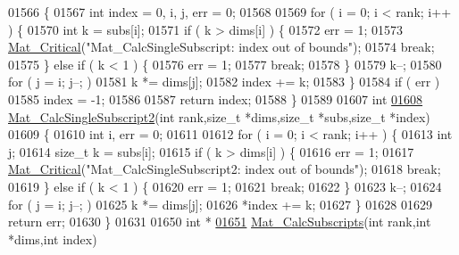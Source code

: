 \begin{DoxyCode}
{{{{{{{{{{{{{{{{{{{{{{{{{{{{{{01566 \{
01567     \textcolor{keywordtype}{int} index = 0, i, j, err = 0;
01568 
01569     \textcolor{keywordflow}{for} ( i = 0; i < rank; i++ ) \{
01570         \textcolor{keywordtype}{int} k = subs[i];
01571         \textcolor{keywordflow}{if} ( k > dims[i] ) \{
01572             err = 1;
01573             \hyperlink{group__mat__util_gaf51f2bfbb5580f575e4dd79757e2b80c}{Mat\_Critical}(\textcolor{stringliteral}{"Mat\_CalcSingleSubscript: index out of bounds"});
01574             \textcolor{keywordflow}{break};
01575         \} \textcolor{keywordflow}{else} \textcolor{keywordflow}{if} ( k < 1 ) \{
01576             err = 1;
01577             \textcolor{keywordflow}{break};
01578         \}
01579         k--;
01580         \textcolor{keywordflow}{for} ( j = i; j--; )
01581             k *= dims[j];
01582         index += k;
01583     \}
01584     \textcolor{keywordflow}{if} ( err )
01585         index = -1;
01586 
01587     \textcolor{keywordflow}{return} index;
01588 \}
01589 
01607 \textcolor{keywordtype}{int}
\hyperlink{group___m_a_t_ga5f7923e9d61ad728c127439044c4ae0e}{01608} \hyperlink{group___m_a_t_ga5f7923e9d61ad728c127439044c4ae0e}{Mat\_CalcSingleSubscript2}(\textcolor{keywordtype}{int} rank,\textcolor{keywordtype}{size\_t} *dims,\textcolor{keywordtype}{size\_t} *subs,\textcolor{keywordtype}{size\_t} *index)
01609 \{
01610     \textcolor{keywordtype}{int} i, err = 0;
01611 
01612     \textcolor{keywordflow}{for} ( i = 0; i < rank; i++ ) \{
01613         \textcolor{keywordtype}{int} j;
01614         \textcolor{keywordtype}{size\_t} k = subs[i];
01615         \textcolor{keywordflow}{if} ( k > dims[i] ) \{
01616             err = 1;
01617             \hyperlink{group__mat__util_gaf51f2bfbb5580f575e4dd79757e2b80c}{Mat\_Critical}(\textcolor{stringliteral}{"Mat\_CalcSingleSubscript2: index out of bounds"});
01618             \textcolor{keywordflow}{break};
01619         \} \textcolor{keywordflow}{else} \textcolor{keywordflow}{if} ( k < 1 ) \{
01620             err = 1;
01621             \textcolor{keywordflow}{break};
01622         \}
01623         k--;
01624         \textcolor{keywordflow}{for} ( j = i; j--; )
01625             k *= dims[j];
01626         *index += k;
01627     \}
01628 
01629     \textcolor{keywordflow}{return} err;
01630 \}
01631 
01650 \textcolor{keywordtype}{int} *
\hyperlink{group___m_a_t_gabe2571a4b9b6cff3b31aa6f152deba61}{01651} \hyperlink{group___m_a_t_gabe2571a4b9b6cff3b31aa6f152deba61}{Mat\_CalcSubscripts}(\textcolor{keywordtype}{int} rank,\textcolor{keywordtype}{int} *dims,\textcolor{keywordtype}{int} index)
}}}}}}}}}}}}}}}}}}}}}}}}}}}}}}
\end{DoxyCode}
